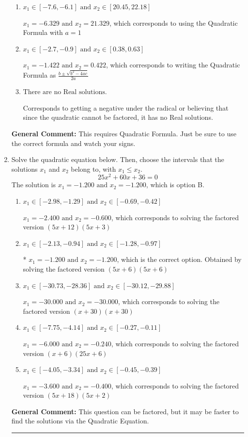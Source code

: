 \documentclass{extbook}[14pt]
\newcommand{\litem}[1]{\item #1

\rule{\textwidth}{0.4pt}}
\begin{document}
\begin{enumerate}
{\begin{enumerate}[label=\Alph*.]
* $x_1 = -0.422 \text{ and } x_2 = 1.422$, which is the correct option.
\item \( x_1 \in [-7.6, -6.1] \text{ and } x_2 \in [20.45, 22.18] \)

 $x_1 = -6.329 \text{ and } x_2 = 21.329$, which corresponds to using the Quadratic Formula with $a=1$
\item \( x_1 \in [-2.7, -0.9] \text{ and } x_2 \in [0.38, 0.63] \)

 $x_1 = -1.422 \text{ and } x_2 = 0.422$, which corresponds to writing the Quadratic Formula as $\frac{b \pm \sqrt{b^2 - 4ac}}{2a}$
\item \( \text{There are no Real solutions.} \)

Corresponds to getting a negative under the radical or believing that since the quadratic cannot be factored, it has no Real solutions.
\end{enumerate}

\textbf{General Comment:} This requires Quadratic Formula. Just be sure to use the correct formula and watch your signs.
}
\litem{
Solve the quadratic equation below. Then, choose the intervals that the solutions $x_1$ and $x_2$ belong to, with $x_1 \leq x_2$.
\[ 25x^{2} +60 x + 36 = 0 \]
The solution is \( x_1 = -1.200 \text{ and } x_2 = -1.200 \), which is option B.\begin{enumerate}[label=\Alph*.]
\item \( x_1 \in [-2.98, -1.29] \text{ and } x_2 \in [-0.69, -0.42] \)

$x_1 = -2.400 \text{ and } x_2 = -0.600$, which corresponds to solving the factored version $(5x + 12)(5x + 3)$
\item \( x_1 \in [-2.13, -0.94] \text{ and } x_2 \in [-1.28, -0.97] \)

* $x_1 = -1.200 \text{ and } x_2 = -1.200$, which is the correct option. Obtained by solving the factored version $(5x + 6)(5x + 6)$
\item \( x_1 \in [-30.73, -28.36] \text{ and } x_2 \in [-30.12, -29.88] \)

$x_1 = -30.000 \text{ and } x_2 = -30.000$, which corresponds to solving the factored version $(x + 30)(x + 30)$
\item \( x_1 \in [-7.75, -4.14] \text{ and } x_2 \in [-0.27, -0.11] \)

$x_1 = -6.000 \text{ and } x_2 = -0.240$, which corresponds to solving the factored version $(x + 6)(25x + 6)$
\item \( x_1 \in [-4.05, -3.34] \text{ and } x_2 \in [-0.45, -0.39] \)

$x_1 = -3.600 \text{ and } x_2 = -0.400$, which corresponds to solving the factored version $(5x + 18)(5x + 2)$
\end{enumerate}

\textbf{General Comment:} This question can be factored, but it may be faster to find the solutions via the Quadratic Equation.
}
\end{enumerate}
\end{document}
